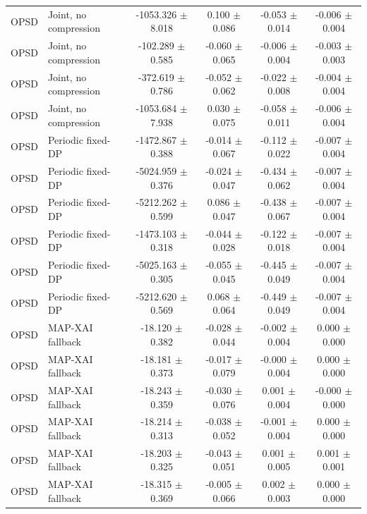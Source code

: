 \begin{table}[t]
\begin{tabular}{llcccc}
OPSD & Joint, no compression & -1053.326 $\pm$ 8.018 & 0.100 $\pm$ 0.086 & -0.053 $\pm$ 0.014 & -0.006 $\pm$ 0.004 \\
OPSD & Joint, no compression & -102.289 $\pm$ 0.585 & -0.060 $\pm$ 0.065 & -0.006 $\pm$ 0.004 & -0.003 $\pm$ 0.003 \\
OPSD & Joint, no compression & -372.619 $\pm$ 0.786 & -0.052 $\pm$ 0.062 & -0.022 $\pm$ 0.008 & -0.004 $\pm$ 0.004 \\
OPSD & Joint, no compression & -1053.684 $\pm$ 7.938 & 0.030 $\pm$ 0.075 & -0.058 $\pm$ 0.011 & -0.006 $\pm$ 0.004 \\
OPSD & Periodic fixed-DP & -1472.867 $\pm$ 0.388 & -0.014 $\pm$ 0.067 & -0.112 $\pm$ 0.022 & -0.007 $\pm$ 0.004 \\
OPSD & Periodic fixed-DP & -5024.959 $\pm$ 0.376 & -0.024 $\pm$ 0.047 & -0.434 $\pm$ 0.062 & -0.007 $\pm$ 0.004 \\
OPSD & Periodic fixed-DP & -5212.262 $\pm$ 0.599 & 0.086 $\pm$ 0.047 & -0.438 $\pm$ 0.067 & -0.007 $\pm$ 0.004 \\
OPSD & Periodic fixed-DP & -1473.103 $\pm$ 0.318 & -0.044 $\pm$ 0.028 & -0.122 $\pm$ 0.018 & -0.007 $\pm$ 0.004 \\
OPSD & Periodic fixed-DP & -5025.163 $\pm$ 0.305 & -0.055 $\pm$ 0.045 & -0.445 $\pm$ 0.049 & -0.007 $\pm$ 0.004 \\
OPSD & Periodic fixed-DP & -5212.620 $\pm$ 0.569 & 0.068 $\pm$ 0.064 & -0.449 $\pm$ 0.049 & -0.007 $\pm$ 0.004 \\
OPSD & MAP-XAI fallback & -18.120 $\pm$ 0.382 & -0.028 $\pm$ 0.044 & -0.002 $\pm$ 0.004 & 0.000 $\pm$ 0.000 \\
OPSD & MAP-XAI fallback & -18.181 $\pm$ 0.373 & -0.017 $\pm$ 0.079 & -0.000 $\pm$ 0.004 & 0.000 $\pm$ 0.000 \\
OPSD & MAP-XAI fallback & -18.243 $\pm$ 0.359 & -0.030 $\pm$ 0.076 & 0.001 $\pm$ 0.004 & -0.000 $\pm$ 0.000 \\
OPSD & MAP-XAI fallback & -18.214 $\pm$ 0.313 & -0.038 $\pm$ 0.052 & -0.001 $\pm$ 0.004 & 0.000 $\pm$ 0.000 \\
OPSD & MAP-XAI fallback & -18.203 $\pm$ 0.325 & -0.043 $\pm$ 0.051 & 0.001 $\pm$ 0.005 & 0.001 $\pm$ 0.001 \\
OPSD & MAP-XAI fallback & -18.315 $\pm$ 0.369 & -0.005 $\pm$ 0.066 & 0.002 $\pm$ 0.003 & 0.000 $\pm$ 0.000 \\
\bottomrule
\end{tabular}
\end{table}

